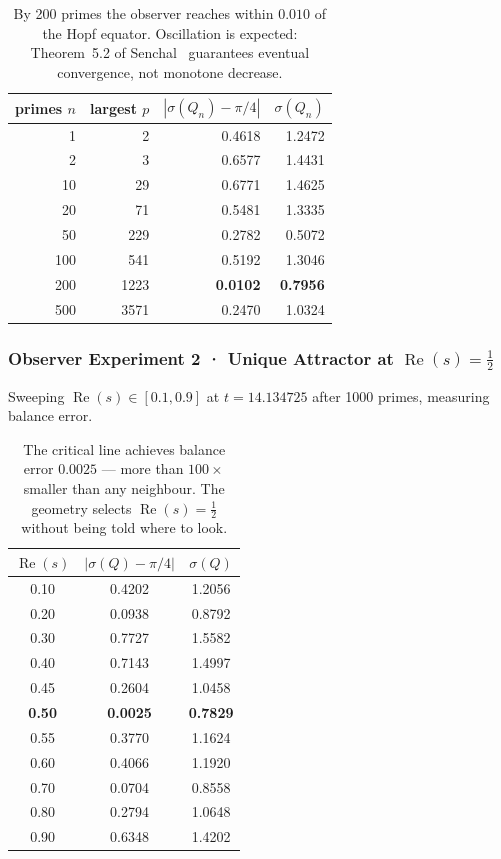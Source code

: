 \documentclass[12pt,a4paper]{article}
\theoremstyle{definition}
\theoremstyle{remark}
\begin{document}
\begin{table}[ht]
\centering
\begin{tabular}{rrrr}
\hline
primes $n$ & largest $p$ & $|\sigma(Q_n) - \pi/4|$ & $\sigma(Q_n)$ \\
\hline
  1   &    2 & 0.4618 & 1.2472 \\
  2   &    3 & 0.6577 & 1.4431 \\
 10   &   29 & 0.6771 & 1.4625 \\
 20   &   71 & 0.5481 & 1.3335 \\
 50   &  229 & 0.2782 & 0.5072 \\
100   &  541 & 0.5192 & 1.3046 \\
200   & 1223 & \textbf{0.0102} & \textbf{0.7956} \\
500   & 3571 & 0.2470 & 1.0324 \\
\hline
\end{tabular}
\caption{By 200 primes the observer reaches within $0.010$ of the Hopf
equator.  Oscillation is expected: Theorem~5.2 of
Senchal~\cite{senchal2026} guarantees eventual convergence, not monotone
decrease.}
\label{tab:obs:exp1}
\end{table}

\subsubsection{Observer Experiment 2 · Unique Attractor at \texorpdfstring{$\operatorname{Re}(s)=\tfrac{1}{2}$}{Re(s)=1/2}}
\label{obs:exp2}

Sweeping $\operatorname{Re}(s) \in [0.1, 0.9]$ at $t = 14.134725$ after 1000
primes, measuring balance error.

\begin{table}[ht]
\centering
\begin{tabular}{ccc}
\hline
$\operatorname{Re}(s)$ & $|\sigma(Q) - \pi/4|$ & $\sigma(Q)$ \\
\hline
0.10 & 0.4202 & 1.2056 \\
0.20 & 0.0938 & 0.8792 \\
0.30 & 0.7727 & 1.5582 \\
0.40 & 0.7143 & 1.4997 \\
0.45 & 0.2604 & 1.0458 \\
\textbf{0.50} & \textbf{0.0025} & \textbf{0.7829} \\
0.55 & 0.3770 & 1.1624 \\
0.60 & 0.4066 & 1.1920 \\
0.70 & 0.0704 & 0.8558 \\
0.80 & 0.2794 & 1.0648 \\
0.90 & 0.6348 & 1.4202 \\
\hline
\end{tabular}
\caption{The critical line achieves balance error $0.0025$ --- more than
$100\times$ smaller than any neighbour.  The geometry selects
$\operatorname{Re}(s) = \tfrac{1}{2}$ without being told where to look.}
\label{tab:obs:exp2}
\end{table}
\end{document}
